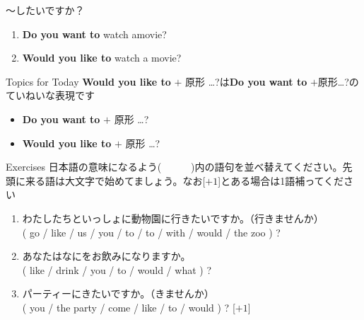 \documentclass[aspectratio=169,xcolor={dvipsnames,table}]{beamer}
\begin{document}
\begin{frame}[plain]{～したいですか？}
\large
 \begin{enumerate}
  \item \textbf{Do you want to} watch amovie?
  \item \textbf{Would you like to} watch a movie?
 \end{enumerate}

\begin{block}{Topics for Today}\small
\textbf{Would you like to} $+$ 原形 \ldots ?は\textbf{Do you want to} $+$原形\ldots ?のていねいな表現です
\begin{itemize}[square]\small
 \item \textbf{Do you want to} $+$ 原形 \ldots ?
 \item \textbf{Would you like to} $+$ 原形 \ldots ?
       \end{itemize}
\end{block}
\hfill{\scriptsize {}}

\end{frame}
\begin{frame}[plain]{Exercises}
日本語の意味になるよう(~~~~~~)内の語句を並べ替えてください。先頭に来る語は大文字で始めてましょう。なお[$+1$]とある場合は1語補ってください

 \begin{enumerate}
  \item わたしたちといっしょに動物園に行きたいですか。（行きませんか）\\
( go / like / us / you / to / to / with / would / the zoo ) ?\\
  \item あなたはなにをお飲みになりますか。\\
( like / drink / you / to / would / what ) ?\\
  \item パーティーにきたいですか。（きませんか）\\
( you / the party / come / like / to / would ) ? [$+1$]\\
\end{enumerate}
\hfill{\scriptsize {}}

\end{frame}
\end{document}
